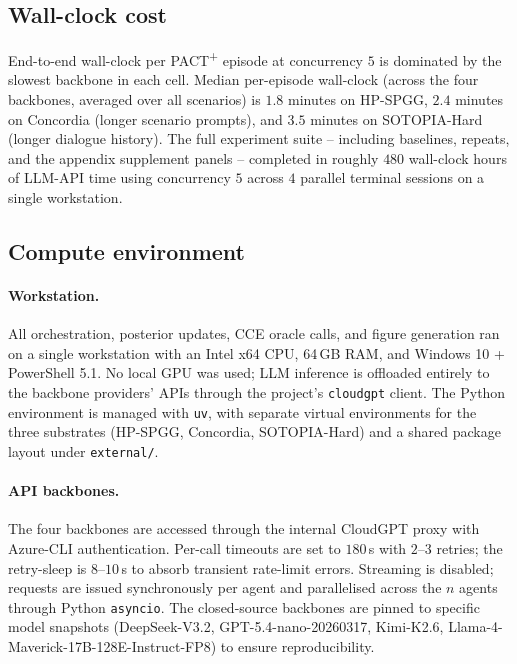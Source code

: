 \subsection{Wall-clock cost}
\label{app:cost-wallclock}

End-to-end wall-clock per PACT\textsuperscript{+} episode at concurrency $5$ is dominated by the slowest backbone in each cell. Median per-episode wall-clock (across the four backbones, averaged over all scenarios) is $1.8$ minutes on HP-SPGG, $2.4$ minutes on Concordia (longer scenario prompts), and $3.5$ minutes on SOTOPIA-Hard (longer dialogue history). The full experiment suite -- including baselines, repeats, and the appendix supplement panels -- completed in roughly $480$ wall-clock hours of LLM-API time using concurrency $5$ across $4$ parallel terminal sessions on a single workstation.

\subsection{Compute environment}
\label{app:cost-hardware}

\paragraph{Workstation.} All orchestration, posterior updates, CCE oracle calls, and figure generation ran on a single workstation with an Intel x64 CPU, 64\,GB RAM, and Windows 10 + PowerShell 5.1. No local GPU was used; LLM inference is offloaded entirely to the backbone providers' APIs through the project's \texttt{cloudgpt} client. The Python environment is managed with \texttt{uv}, with separate virtual environments for the three substrates (HP-SPGG, Concordia, SOTOPIA-Hard) and a shared package layout under \texttt{external/}.

\paragraph{API backbones.} The four backbones are accessed through the internal CloudGPT proxy with Azure-CLI authentication. Per-call timeouts are set to $180$\,s with $2$--$3$ retries; the retry-sleep is $8$--$10$\,s to absorb transient rate-limit errors. Streaming is disabled; requests are issued synchronously per agent and parallelised across the $n$ agents through Python \texttt{asyncio}. The closed-source backbones are pinned to specific model snapshots (DeepSeek-V3.2, GPT-5.4-nano-20260317, Kimi-K2.6, Llama-4-Maverick-17B-128E-Instruct-FP8) to ensure reproducibility.

